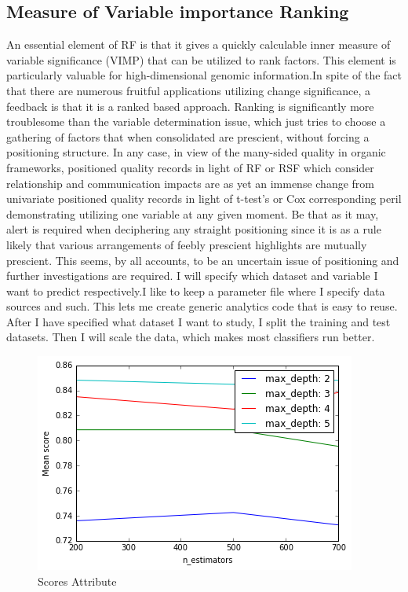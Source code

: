 \documentclass[sigconf]{acmart}
\begin{document}
\subsection{Measure of Variable importance Ranking}
An essential element of RF is that it gives a quickly calculable inner measure of variable significance (VIMP) that can be utilized to rank factors. This element is particularly valuable for high-dimensional genomic information.In spite of the fact that there are numerous fruitful applications utilizing change significance, a feedback is that it is a ranked based approach. Ranking is significantly more troublesome than the variable determination issue, which just tries to choose a gathering of factors that when consolidated are prescient, without forcing a positioning structure. In any case, in view of the many-sided quality in organic frameworks, positioned quality records in light of RF or RSF which consider relationship and communication impacts are as yet an immense change from univariate positioned quality records in light of t-test's or Cox corresponding peril demonstrating utilizing one variable at any given moment. Be that as it may, alert is required when deciphering any straight positioning since it is as a rule likely that various arrangements of feebly prescient highlights are mutually prescient. This seems, by all accounts, to be an uncertain issue of positioning and further investigations are required.
I will specify which dataset and variable I want to predict respectively.I like to keep a parameter file where I specify data sources and such. This lets me create generic analytics code that is easy to reuse.
After I have specified what dataset I want to study, I split the training and test datasets. Then I will scale the data, which makes most classifiers run better.

\begin{figure}
    \centering
    \includegraphics[width=1.0\columnwidth]{project/images/output_15_1.png}
    \caption{Scores Attribute}
    \label{Score}
\end{figure}
\end{document}
